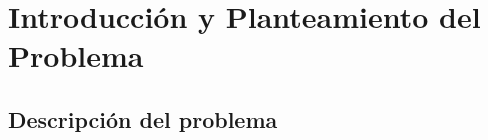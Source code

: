\chapter{Introducción y Planteamiento del Problema}
\label{cap:introduccion}

\section{Descripción del problema}
\label{sec:problema}

